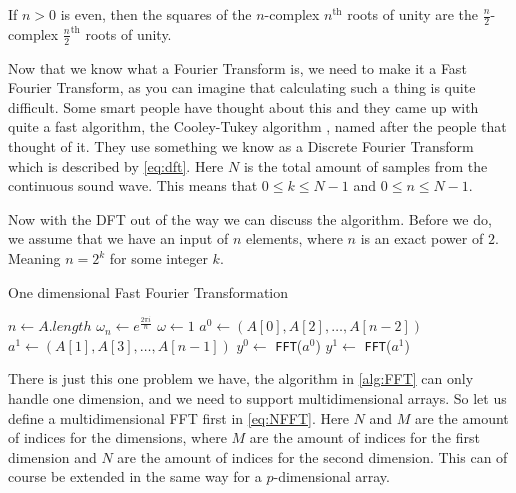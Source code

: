 \begin{lemma} \label{lemma:halving}
    If $n > 0$ is even, then the squares of the $n$-complex $n^{\text{th}}$ roots of unity are the $\frac{n}{2}$-complex $\frac{n}{2}^{\text{th}}$ roots of unity.
\end{lemma}

Now that we know what a Fourier Transform is, we need to make it a Fast Fourier Transform, as you can imagine that calculating such a thing is quite difficult. Some smart people have thought
about this and they came up with quite a fast algorithm, the Cooley-Tukey algorithm \cite{fft}, named after the people that thought of it. They use something we know as a Discrete Fourier 
Transform which is described by \autoref{eq:dft}. Here $N$ is the total amount of samples from the continuous sound wave. This means that $0 \leq k \leq N - 1$ and $0 \leq n \leq N - 1$.

Now with the DFT out of the way we can discuss the algorithm. Before we do, we assume that we have an input of $n$ elements, where $n$ is an exact power of $2$. Meaning $n = 2^k$ for some 
integer $k$.

\begin{algorithm}
    \caption{One dimensional Fast Fourier Transformation}
    \label{alg:FFT}
    $n \leftarrow A.length$ \;
    $\omega_n \leftarrow e^{\frac{2\pi i}{n}}$ \;
    $\omega \leftarrow 1$ \;
    $a^0 \leftarrow (A[0], A[2], \dots, A[n - 2])$ \;
    $a^1 \leftarrow (A[1], A[3], \dots, A[n - 1])$ \;
    $y^0 \leftarrow $ \texttt{FFT}($a^0$) \;
    $y^1 \leftarrow $ \texttt{FFT}($a^1$) \;
\end{algorithm}

There is just this one problem we have, the algorithm in \autoref{alg:FFT} can only handle one dimension, and we need to support multidimensional arrays. So let us define a multidimensional FFT 
first in \autoref{eq:NFFT}. Here $N$ and $M$ are the amount of indices for the dimensions, where $M$ are the amount of indices for the first dimension and $N$ are the amount of indices for the 
second dimension. This can of course be extended in the same way for a $p$-dimensional array.


